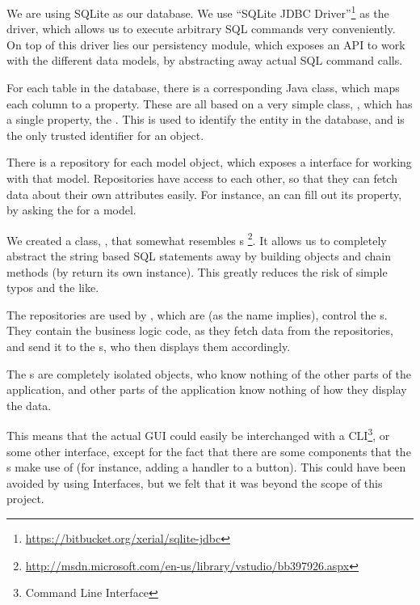 We are using SQLite as our database. We use ``SQLite JDBC Driver''\footnote{\url{https://bitbucket.org/xerial/sqlite-jdbc}} as the driver, which allows us to execute arbitrary SQL commands very conveniently. On top of this driver lies our persistency module, which exposes an API to work with the different data models, by abstracting away actual SQL command calls.

For each table in the database, there is a corresponding Java class, which maps each column to a property. These are all based on a very simple class, , which has a single property, the . This is used to identify the entity in the database, and is the only trusted identifier for an object. 

There is a repository for each model object, which exposes a  interface for working with that model. Repositories have access to each other, so that they can fetch data about their own attributes easily. For instance, an  can fill out its  property, by asking the  for a  model.

We created a class, , that somewhat resembles s \footnote{\url{http://msdn.microsoft.com/en-us/library/vstudio/bb397926.aspx}}. It allows us to completely abstract the string based SQL statements away by building  objects and chain methods (by return its own instance). This greatly reduces the risk of simple typos and the like.

The repositories are used by , which are (as the name implies), control the s. They contain the business logic code, as they fetch data from the repositories, and send it to the s, who then displays them accordingly. 

The s are completely isolated objects, who know nothing of the other parts of the application, and other parts of the application know nothing of how they display the data. 

This means that the actual GUI could easily be interchanged with a CLI\footnote{Command Line Interface}, or some other interface, except for the fact that there are some  components that the s make use of (for instance, adding a handler to a button). This could have been avoided by using Interfaces, but we felt that it was beyond the scope of this project.